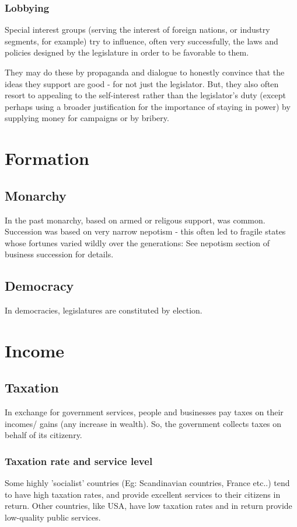 \documentclass[oneside, article]{memoir}
\begin{document}
\subsubsection{Lobbying}
Special interest groups (serving the interest of foreign nations, or industry segments, for example) try to influence, often very successfully, the laws and policies designed by the legislature in order to be favorable to them.

They may do these by propaganda and dialogue to honestly convince that the ideas they support are good - for not just the legislator. But, they also often resort to appealing to the self-interest rather than the legislator's duty (except perhaps using a broader justification for the importance of staying in power) by supplying money for campaigns or by bribery.

\section{Formation}
\subsection{Monarchy}
In the past monarchy, based on armed or religous support, was common. Succession was based on very narrow nepotism - this often led to fragile states whose fortunes varied wildly over the generations: See nepotism section of business succession for details. 

\subsection{Democracy}
In democracies, legislatures are constituted by election. \tbc

\section{Income}
\subsection{Taxation}
In exchange for government services, people and businesses pay taxes on their incomes/ gains (any increase in wealth). So, the government collects taxes on behalf of its citizenry.

\subsubsection{Taxation rate and service level}
Some highly 'socialist' countries (Eg: Scandinavian countries, France etc..) tend to have high taxation rates, and provide excellent services to their citizens in return. Other countries, like USA, have low taxation rates and in return provide low-quality public services.
\end{document}
